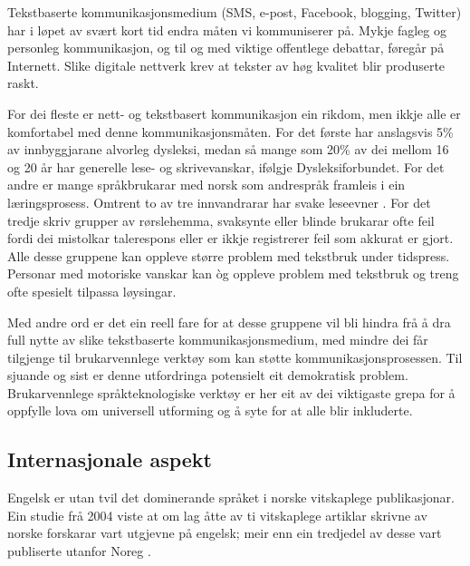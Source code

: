 \begin{multicols}{2}

Tekstbaserte kommunikasjonsmedium (SMS, e-post, Facebook, blogging, Twitter) har i løpet av svært kort tid endra måten vi kommuniserer på. 
Mykje fagleg og personleg kommunikasjon, og til og med viktige offentlege debattar, føregår på Internett. Slike digitale nettverk krev at tekster av høg kvalitet blir produserte raskt. 

For dei fleste er nett- og tekstbasert kommunikasjon ein rikdom, men ikkje alle er komfortabel med denne kommunikasjonsmåten. 
For det første har anslagsvis 5\% av innbyggjarane alvorleg dysleksi, medan så mange som 20\% av dei mellom 16 og 20 år har generelle lese- og skrivevanskar, ifølgje Dysleksiforbundet. 
For det andre er mange språkbrukarar med norsk som andrespråk framleis i ein læringsprosess. 
Omtrent to av tre innvandrarar har svake leseevner \cite{gabrielsen2007}.
For det tredje skriv grupper av rørslehemma, svaksynte eller blinde brukarar ofte feil fordi dei mistolkar talerespons eller er ikkje registrerer feil som akkurat er gjort. 
Alle desse gruppene kan oppleve større problem med tekstbruk under tidspress. 
Personar med motoriske vanskar kan òg oppleve problem med tekstbruk og treng ofte spesielt tilpassa løysingar.

Med andre ord er det ein reell fare for at desse gruppene vil bli hindra frå å dra full nytte av slike tekstbaserte kommunikasjonsmedium, med mindre dei får tilgjenge til brukarvennlege verktøy som kan støtte kommunikasjonsprosessen. 
Til sjuande og sist er denne utfordringa potensielt eit demokratisk problem. 
Brukarvennlege språkteknologiske verktøy er her eit av dei viktigaste grepa for å oppfylle lova om universell utforming og å syte for at alle blir inkluderte.

\subsection{Internasjonale aspekt}

Engelsk er utan tvil det dominerande språket i norske vitskaplege publikasjonar. Ein studie frå 2004 viste at om lag åtte av ti vitskaplege artiklar skrivne av norske forskarar vart utgjevne på engelsk; meir enn ein tredjedel av desse vart publiserte utanfor Noreg \cite{schwach2004}.


\end{multicols}
